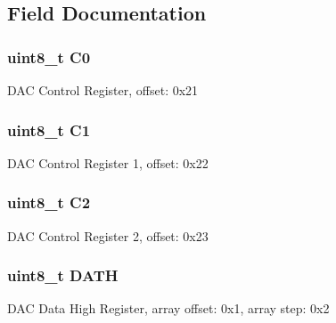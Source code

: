 \subsection{Field Documentation}
\hypertarget{struct_d_a_c___mem_map_a88317928f6b49bb03517258dd5fd5423}{}
\subsubsection[{C0}]{\setlength{\rightskip}{0pt plus 5cm}uint8\+\_\+t C0}\label{struct_d_a_c___mem_map_a88317928f6b49bb03517258dd5fd5423}
D\+A\+C Control Register, offset\+: 0x21 \hypertarget{struct_d_a_c___mem_map_a8286c9d870f31a089d95e6a2285fbe2f}{}
\subsubsection[{C1}]{\setlength{\rightskip}{0pt plus 5cm}uint8\+\_\+t C1}\label{struct_d_a_c___mem_map_a8286c9d870f31a089d95e6a2285fbe2f}
D\+A\+C Control Register 1, offset\+: 0x22 \hypertarget{struct_d_a_c___mem_map_acdf8ac8ab339152eaed13f4eca300aa5}{}
\subsubsection[{C2}]{\setlength{\rightskip}{0pt plus 5cm}uint8\+\_\+t C2}\label{struct_d_a_c___mem_map_acdf8ac8ab339152eaed13f4eca300aa5}
D\+A\+C Control Register 2, offset\+: 0x23 \hypertarget{struct_d_a_c___mem_map_a4de933f720c069768296b4dc0a0f0499}{}
\subsubsection[{D\+A\+T\+H}]{\setlength{\rightskip}{0pt plus 5cm}uint8\+\_\+t D\+A\+T\+H}\label{struct_d_a_c___mem_map_a4de933f720c069768296b4dc0a0f0499}
D\+A\+C Data High Register, array offset\+: 0x1, array step\+: 0x2 \hypertarget{struct_d_a_c___mem_map_a906a4999a740a6bc4fd750743203c7a1}{}
